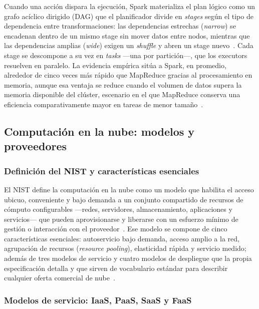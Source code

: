 \documentclass[11pt,a4paper]{article}
\begin{document}
Cuando una acción dispara la ejecución, Spark materializa el plan
lógico como un grafo acíclico dirigido (DAG) que el planificador divide
en \emph{stages} según el tipo de dependencia entre transformaciones:
las dependencias estrechas (\emph{narrow}) se encadenan dentro de un
mismo stage sin mover datos entre nodos, mientras que las dependencias
amplias (\emph{wide}) exigen un \emph{shuffle} y abren un stage
nuevo~\autocite{tang2020,khuat2025}. Cada stage se descompone a su vez en
\emph{tasks} —una por partición—, que los executors resuelven en
paralelo. La evidencia empírica sitúa a Spark, en promedio, alrededor
de cinco veces más rápido que MapReduce gracias al procesamiento en
memoria, aunque esa ventaja se reduce cuando el volumen de datos
supera la memoria disponible del clúster, escenario en el que
MapReduce conserva una eficiencia comparativamente mayor en tareas de
menor tamaño~\autocite{tekdogan2021,utami2024}.

    \subsection{Computación en la nube: modelos y proveedores}
    \label{sec:fundamento-cloud}

    \subsubsection{Definición del NIST y características esenciales}

    El NIST define la computación en la nube como un modelo que habilita
    el acceso ubicuo, conveniente y bajo demanda a un conjunto compartido
    de recursos de cómputo configurables —redes, servidores,
    almacenamiento, aplicaciones y servicios— que pueden aprovisionarse y
    liberarse con un esfuerzo mínimo de gestión o interacción con el
    proveedor~\autocite{mell2011}. Ese modelo se compone de cinco
    características esenciales: autoservicio bajo demanda, acceso amplio a
    la red, agrupación de recursos (\emph{resource pooling}), elasticidad
    rápida y servicio medido; además de tres modelos de servicio y cuatro
    modelos de despliegue que la propia especificación detalla y que
    sirven de vocabulario estándar para describir cualquier oferta
    comercial de nube~\autocite{mell2011,poggi2017}.

    \subsubsection{Modelos de servicio: IaaS, PaaS, SaaS y FaaS}
\end{document}
